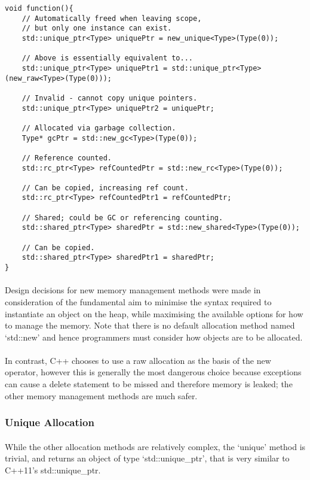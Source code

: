 \documentclass[12pt,twoside,notitlepage]{report}
\begin{document}
\begin{lstlisting}
void function(){
	// Automatically freed when leaving scope,
	// but only one instance can exist.
	std::unique_ptr<Type> uniquePtr = new_unique<Type>(Type(0));
	
	// Above is essentially equivalent to...
	std::unique_ptr<Type> uniquePtr1 = std::unique_ptr<Type>(new_raw<Type>(Type(0)));
	
	// Invalid - cannot copy unique pointers.
	std::unique_ptr<Type> uniquePtr2 = uniquePtr;
	
	// Allocated via garbage collection.
	Type* gcPtr = std::new_gc<Type>(Type(0));
	
	// Reference counted.
	std::rc_ptr<Type> refCountedPtr = std::new_rc<Type>(Type(0));
	
	// Can be copied, increasing ref count.
	std::rc_ptr<Type> refCountedPtr1 = refCountedPtr;
	
	// Shared; could be GC or referencing counting.
	std::shared_ptr<Type> sharedPtr = std::new_shared<Type>(Type(0));
	
	// Can be copied.
	std::shared_ptr<Type> sharedPtr1 = sharedPtr;
}
\end{lstlisting}


\paragraph{}
Design decisions for new memory management methods were made in consideration of the fundamental aim to minimise the syntax required to instantiate an object on the heap, while maximising the available options for how to manage the memory. Note that there is no default allocation method named `std::new' and hence programmers must consider how objects are to be allocated.

\paragraph{}
In contrast, C++ chooses to use a raw allocation as the basis of the new operator, however this is generally the most dangerous choice because exceptions can cause a delete statement to be missed and therefore memory is leaked; the other memory management methods are much safer.

\subsubsection{Unique Allocation}

\paragraph{}
While the other allocation methods are relatively complex, the `unique' method is trivial, and returns an object of type `std::unique\_ptr', that is very similar to C++11's std::unique\_ptr.
\end{document}
